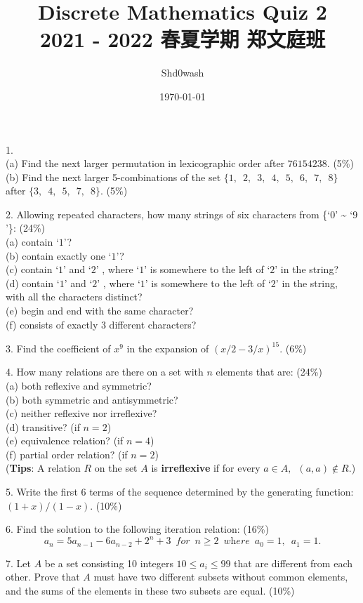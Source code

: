 \documentclass{article}
\title{Discrete Mathematics Quiz 2\\\small{2021 - 2022 \enspace 春夏学期 \enspace 郑文庭班}}
\author{Shd0wash}
\date{\today}
\begin{document}
\maketitle

1.\\
(a) Find the next larger permutation in lexicographic order after $76154238$. (5\%)\\
(b) Find the next larger 5-combinations of the set $\{1, \enspace 2, \enspace 3, \enspace 4, \enspace 5, \enspace 6, \enspace 7, \enspace 8\}$ after 
$\{3, \enspace 4, \enspace 5, \enspace 7, \enspace 8\}$. (5\%)

2. Allowing repeated characters, how many strings of six characters from \{`$0$' \~{} `$9$'\}: (24\%)\\
(a) contain `$1$'?\\
(b) contain exactly one `$1$'?\\
(c) contain `$1$' and `$2$' , where `$1$' is somewhere to the left of `$2$' in the string?\\
(d) contain `$1$' and `$2$' , where `$1$' is somewhere to the left of `$2$' in the string, with all the characters distinct?\\
(e) begin and end with the same character?\\
(f) consists of exactly $3$ different characters?

3. Find the coefficient of $x^{9}$ in the expansion of $(x/2 - 3/x)^{15}$. (6\%)

4. How many relations are there on a set with $n$ elements that are: (24\%)\\
(a) both reflexive and symmetric?\\
(b) both symmetric and antisymmetric?\\
(c) neither reflexive nor irreflexive?\\
(d) transitive? (if $n=2$)\\
(e) equivalence relation? (if $n=4$)\\
(f) partial order relation? (if $n=2$)\\
(\textbf{Tips}: A relation $R$ on the set $A$ is \textbf{irreflexive} if for every $a \in A, \enspace (a,a) \notin R.$)

5. Write the first $6$ terms of the sequence determined by the generating function: $(1 + x)/(1 - x)$. (10\%)

6. Find the solution to the following iteration relation: (16\%)\\
\[a_{n} = 5a_{n-1} - 6a_{n-2} + 2^{n} + 3 \enspace \textit{for} \enspace n \geq 2 \enspace \textit{where} \enspace a_{0} = 1, \enspace a_{1} = 1.\]

7. Let $A$ be a set consisting 10 integers $10 \leq a_{i} \leq 99$ that are different from each other. Prove that $A$ must have two different subsets without 
common elements, and the sums of the elements in these two subsets are equal. (10\%)
\end{document}
